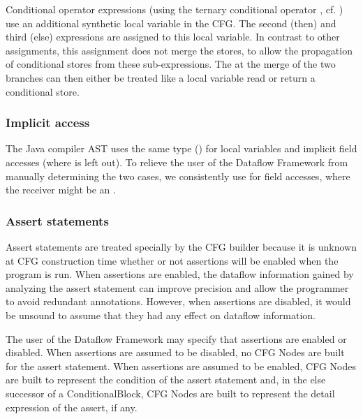 Conditional operator expressions (using the ternary conditional operator
, cf. ) use an additional synthetic local
variable in the CFG. The second (then) and third (else) expressions are
assigned to this local variable. In contrast to other assignments, this
assignment does not merge the stores, to allow the propagation of
conditional stores from these sub-expressions.
The  at the merge of the two branches can
then either be treated like a local variable read or return a
conditional store.



\subsubsection{Implicit  access}

The Java compiler AST uses the same type () for
local variables and implicit field accesses (where  is
left out).  To relieve the user of the Dataflow Framework from
manually determining the two cases, we consistently use
 for field accesses, where the receiver might be
an .


\subsubsection{Assert statements}
\label{sec:assert-stmts}

Assert statements are treated specially by the CFG builder because it
is unknown at CFG construction time whether or not assertions will be
enabled when the program is run.  When assertions are enabled, the
dataflow information gained by analyzing the assert statement can
improve precision and allow the programmer to avoid redundant
annotations.  However, when assertions are disabled, it would be
unsound to assume that they had any effect on dataflow information.

The user of the Dataflow Framework may specify that
assertions are enabled or disabled.  When assertions are assumed to be
disabled, no CFG Nodes are built for the assert statement.
When assertions are assumed to be enabled, CFG Nodes are built to
represent the condition of the assert statement and, in the else
successor of a ConditionalBlock, CFG Nodes are built to represent the
detail expression of the assert, if any.

